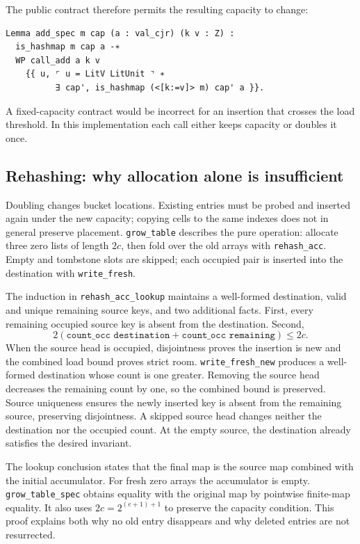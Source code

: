 \documentclass[11pt]{article}
\begin{document}
The public contract therefore permits the resulting capacity to change:
\begin{lstlisting}
Lemma add_spec m cap (a : val_cjr) (k v : Z) :
  is_hashmap m cap a -∗
  WP call_add a k v
    {{ u, ⌜ u = LitV LitUnit ⌝ ∗
          ∃ cap', is_hashmap (<[k:=v]> m) cap' a }}.
\end{lstlisting} A fixed-capacity
contract would be incorrect for an insertion that crosses the load threshold.
In this implementation each call either keeps capacity or doubles it once.

\subsection{Rehashing: why allocation alone is insufficient}

Doubling changes bucket locations. Existing entries must be probed and inserted
again under the new capacity; copying cells to the same indexes does not in
general preserve placement. \texttt{grow\_table} describes the pure operation:
allocate three zero lists of length $2c$, then fold over the old arrays with
\texttt{rehash\_acc}. Empty and tombstone slots are skipped; each occupied pair
is inserted into the destination with \texttt{write\_fresh}.

The induction in \texttt{rehash\_acc\_lookup} maintains a well-formed destination,
valid and unique remaining source keys, and two additional facts. First, every
remaining occupied source key is absent from the destination. Second,
\[
 2(\texttt{count\_occ destination}
       +\texttt{count\_occ remaining})\leq 2c.
\]
When the source head is occupied, disjointness proves the insertion is new and
the combined load bound proves strict room. \texttt{write\_fresh\_new}
produces a well-formed destination whose count is one greater. Removing the
source head decreases the remaining count by one, so the combined bound is
preserved. Source uniqueness ensures the newly inserted key is absent from the
remaining source, preserving disjointness. A skipped source head changes neither
the destination nor the occupied count. At the empty source, the destination
already satisfies the desired invariant.

The lookup conclusion states that the final map is the source map combined
with the initial accumulator. For fresh zero arrays the accumulator is empty.
\texttt{grow\_table\_spec} obtains equality with the original map by
pointwise finite-map equality. It also uses
$2c=2^{(e+1)+1}$ to preserve the capacity condition. This proof explains both
why no old entry disappears and why deleted entries are not resurrected.
\end{document}

